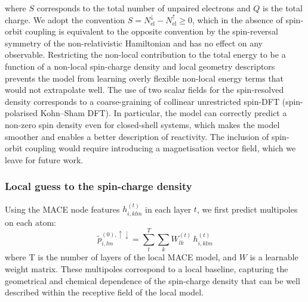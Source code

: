 \documentclass[aps,%
superscriptaddress,
 amsmath,amssymb,
floatfix,
twocolumn
]{revtex4-2}
\begin{document}
where $S$ corresponds to the total number of unpaired electrons and $Q$ is the total charge. We adopt the convention $S = N^{\downarrow}_{\text{el}} - N^{\uparrow}_{\text{el}} \geq 0$, which in the absence of spin-orbit coupling is equivalent to the opposite convention by the spin-reversal 
symmetry of the non-relativistic Hamiltonian and has no effect on any observable.
Restricting the non-local contribution to the total energy to be a function of a non-local spin-charge density and local geometry descriptors prevents the model from learning overly flexible non-local energy terms that would not extrapolate well. The use of two scalar fields for the spin-resolved density corresponds to a coarse-graining of collinear unrestricted spin-DFT (spin-polarised Kohn–Sham DFT). In particular, the model can correctly predict a non-zero spin density even for closed-shell systems, which makes the model smoother and enables a better description of reactivity. The inclusion of spin-orbit coupling would require introducing a magnetisation vector field, which we leave for future work.

\subsubsection{Local guess to the spin-charge density}

Using the MACE node features $h_{i,klm}^{(t)}$ in each layer $t$, we first predict multipoles on each atom:
%
\begin{equation}
\tilde{p}_{i,lm}^{(0),\uparrow \downarrow} =\sum_{t}^{T} \sum_{k} W_{lk}^{(t)}\, h_{i,klm}^{(t)}
\end{equation}
%
where T is the number of layers of the local MACE model, and $W$ is a learnable weight matrix. 
These multipoles correspond to a local baseline, capturing the geometrical and chemical dependence of the spin-charge density that can be well described within the receptive field of the local model.
\end{document}
